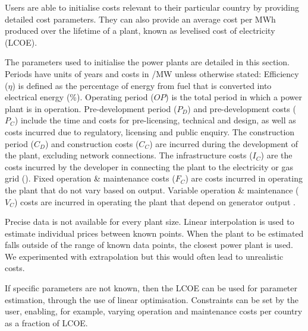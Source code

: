 Users are able to initialise costs relevant to their particular country by providing detailed cost parameters. They can also provide an average cost per MWh produced over the lifetime of a plant, known as levelised cost of electricity (LCOE).

The parameters used to initialise the power plants are detailed in this section. Periods have units of years and costs in \textsterling/MW unless otherwise stated: Efficiency ($\eta$) is defined as the percentage of energy from fuel that is converted into electrical energy (\%). Operating period ($OP$) is the total period in which a power plant is in operation. Pre-development period ($P_D$) and pre-development costs ($P_C$) include the time and costs for pre-licensing, technical and design, as well as costs incurred due to regulatory, licensing and public enquiry. The construction period ($C_D$) and construction costs ($C_C$) are incurred during the development of the plant, excluding network connections. The infrastructure costs ($I_C$) are the costs incurred by the developer in connecting the plant to the electricity or gas grid (\textsterling). Fixed operation \& maintenance costs ($F_C$) are costs incurred in operating the plant that do not vary based on output. Variable operation \& maintenance ($V_C$) costs are incurred in operating the plant that depend on generator output \cite{Ltd2016}.




Precise data is not available for every plant size. Linear interpolation is used to estimate individual prices between known points. When the plant to be estimated falls outside of the range of known data points, the closest power plant is used. We experimented with extrapolation but this would often lead to unrealistic costs. %

If specific parameters are not known, then the LCOE can be used for parameter estimation, through the use of linear optimisation. Constraints can be set by the user, enabling, for example, varying operation and maintenance costs per country as a fraction of LCOE.

